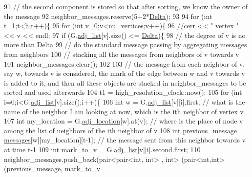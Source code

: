 \begin{DoxyCode}
91   \textcolor{comment}{// the second component is stored so that after sorting, we know the owner of the message}
92   neighbor\_messages.reserve(5+2*\hyperlink{classgraph__message_a45dfd061b7bc73572e5132fbf66efd55}{Delta});
93 
94   \textcolor{keywordflow}{for} (\textcolor{keywordtype}{int} t=1;t<\hyperlink{classgraph__message_a934d63ed7275c211e13c6fb68824ed46}{h};t++)\{
95     \textcolor{keywordflow}{for} (\textcolor{keywordtype}{int} v=0;v<nu\_vertices;v++)\{
96       \textcolor{comment}{//cerr << " vertex " << v << endl;}
97       \textcolor{keywordflow}{if} (G.\hyperlink{classmarked__graph_a1a0bf7ca413a278763f7c878b3b6fd6f}{adj\_list}[v].size() <= \hyperlink{classgraph__message_a45dfd061b7bc73572e5132fbf66efd55}{Delta})\{
98         \textcolor{comment}{// the degree of v is no more than Delta}
99         \textcolor{comment}{// do the standard message passing by aggregating messages from neighbors}
100         \textcolor{comment}{// stacking all the messages from neighbors of v towards v}
101         neighbor\_messages.clear();
102 
103         \textcolor{comment}{// the message from each neighbor of v, say w,  towards v is considered, the mark of the edge
       between w and v towards v is added to it, and then all these objects are stacked in neighbor\_messages to be
       sorted and used afterwards}
104         t1 = high\_resolution\_clock::now();
105         \textcolor{keywordflow}{for} (\textcolor{keywordtype}{int} i=0;i<G.\hyperlink{classmarked__graph_a1a0bf7ca413a278763f7c878b3b6fd6f}{adj\_list}[v].size();i++)\{
106           \textcolor{keywordtype}{int} w = G.\hyperlink{classmarked__graph_a1a0bf7ca413a278763f7c878b3b6fd6f}{adj\_list}[v][i].first; \textcolor{comment}{// what is the name of the neighbor I am looking at now,
       which is the ith neighbor of vertex v }
107           \textcolor{keywordtype}{int} my\_location = G.\hyperlink{classmarked__graph_a3ae722ea9583ad23af34d789a88ac01a}{adj\_location}[w].at(v); \textcolor{comment}{// where is the place of node v among the
       list of neighbors of the ith neighbor of v}
108           \textcolor{keywordtype}{int} previous\_message = \hyperlink{classgraph__message_aac77e098f0acf9650116a8e51fe3b4b7}{messages}[w][my\_location][t-1]; \textcolor{comment}{// the message sent from this
       neighbor towards v at time t-1}
109           \textcolor{keywordtype}{int} mark\_to\_v = G.\hyperlink{classmarked__graph_a1a0bf7ca413a278763f7c878b3b6fd6f}{adj\_list}[v][i].second.first;
110           neighbor\_messages.push\_back(pair<pair<int, int> , \textcolor{keywordtype}{int}> (pair<int,int>(previous\_message, mark\_to\_v

\end{DoxyCode}
